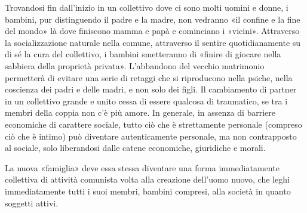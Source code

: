 \documentclass[../main]{subfiles}
\begin{document}
Trovandosi fin dall'inizio in un collettivo dove ci sono molti uomini e donne, i bambini, pur distinguendo il padre e la madre, non vedranno «il confine e la fine del mondo» là dove finiscono mamma e papà e cominciano i «vicini». Attraverso la socializzazione naturale nella comune, attraverso il sentire quotidianamente su di sé la cura del collettivo, i bambini smetteranno di «finire di giocare nella sabbiera della proprietà privata». L'abbandono del vecchio matrimonio permetterà di evitare una serie di retaggi che si riproducono nella psiche, nella coscienza dei padri e delle madri, e non solo dei figli. Il cambiamento di partner in un collettivo grande e unito cessa di essere qualcosa di traumatico, se tra i membri della coppia non c'è più amore. In generale, in assenza di barriere economiche di carattere sociale, tutto ciò che è strettamente personale (compreso ciò che è intimo) può diventare autenticamente personale, ma non contrapposto al sociale, solo liberandosi dalle catene economiche, giuridiche e morali.

La nuova «famiglia» deve essa stessa diventare una forma immediatamente collettiva di attività comunista volta alla creazione dell'uomo nuovo, che leghi immediatamente tutti i suoi membri, bambini compresi, alla società in quanto soggetti attivi.
\end{document}
